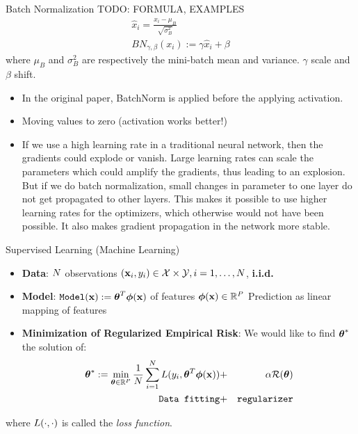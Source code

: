 \documentclass[xcolor=pdftex,dvipsnames,table,mathserif]{beamer}
\begin{document}
\begin{frame}{Batch Normalization}
TODO: FORMULA, EXAMPLES
\begin{eqnarray*}
\hat{x}_i = \frac{x_i-\mu_{B}}{\sqrt{\sigma^2_B}}\\
BN_{\gamma,\beta}(x_i):= \gamma \hat{x}_i + \beta
\end{eqnarray*}
where $\mu_{B}$ and $\sigma^2_B$ are respectively the mini-batch mean and variance. $\gamma$ scale and $\beta$ shift.
\begin{itemize}
\item In the original paper, BatchNorm is applied before the applying activation.
\item Moving values to zero (activation works better!) 
\item If we use a high learning rate in a traditional neural network, then the gradients could explode or vanish. Large learning rates can scale the parameters which could amplify the gradients, thus leading to an explosion. But if we do batch normalization, small changes in parameter to one layer do not get propagated to other layers. This makes it possible to use higher learning rates for the optimizers, which otherwise would not have been possible. It also makes gradient propagation in the network more stable.
\end{itemize}
\cite{ioffe2015batch}  \cite{mishkin2015all}
\end{frame}




\begin{frame}{Supervised Learning (Machine Learning)}
\begin{itemize}
\item \textbf{Data}: $N$ observations $(\mathbf{x}_i,y_i) \in \mathcal{X} \times \mathcal{Y}, i=1,\ldots,N$, \alert{\textbf{i.i.d.}}
\item \textbf{Model}: $\texttt{Model}(\mathbf{x}):=\boldsymbol{\theta}^T\boldsymbol{\phi} (\mathbf{x})$ of features  $\boldsymbol{\phi} (\mathbf{x}) \in \mathbb{R}^P$ \alert{Prediction as linear mapping of features}
\item \textbf{Minimization of Regularized Empirical Risk}: We would like to find $\boldsymbol{\theta}^{*}$ the solution of:
\begin{eqnarray*}
\boldsymbol{\theta}^{*}:=\min_{\boldsymbol{\theta} \in \mathbb{R}^P} \frac{1}{N} \sum_{i=1}^{N} L(y_i,\boldsymbol{\theta}^T\boldsymbol{\phi} (\mathbf{x}))&  + &\alpha \mathcal{R}(\boldsymbol{\theta}) \\
\texttt{Data fitting}& + &\texttt{regularizer}
\end{eqnarray*}
\end{itemize}
where $L(\cdot,\cdot)$ is called the  \emph{loss function}.
\end{frame}
\end{document}
